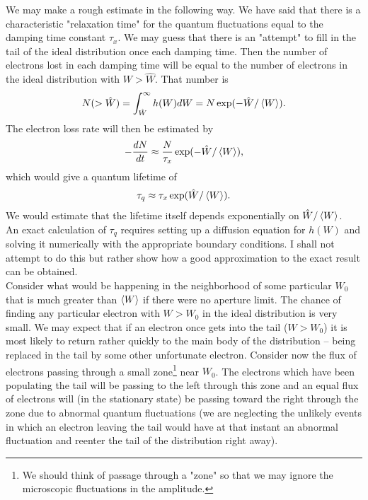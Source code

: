 We may make a rough estimate in the following way. We have said that there is a characteristic
 "relaxation time" for the quantum fluctuations equal to the damping time constant $\tau_x$. We may guess that there is an "attempt" to fill in the tail of the ideal distribution once each damping time. Then the number of electrons lost in each damping time will be equal to the number of electrons in the ideal distribution with $W > \hat{W}$. That number is
\begin{align}
	N(>\hat{W}) = \int_{\hat{W}}^\infty h(W) dW = N \exp(-\hat{W}/\left< W \right>).
\end{align}
The electron loss rate will then be estimated by
\begin{align}
	- \dfrac{dN}{dt} \approx \dfrac{N}{\tau_x} \exp(-\hat{W}/\left< W \right>),
\end{align}
which would give a quantum lifetime of
\begin{align}\label{eq:5.123}
	\tau_q \approx \tau_x \exp(\hat{W}/\left< W \right>).
\end{align}
We would estimate that the lifetime itself depends exponentially on $\hat{W}/\left< W \right>$.\\
An exact calculation of $\tau_q$ requires setting up a diffusion equation for $h(W)$ and solving it numerically with the appropriate boundary conditions. I shall not attempt to do this but rather show how a good approximation to the exact result can be obtained.\\
Consider what would be happening in the neighborhood of some particular $W_0$ that is much greater than $\left< W \right>$ if there were no aperture limit. The chance of finding any particular
 electron with $W > W_0$ in the ideal distribution is very small. We may expect that if an electron once gets into the tail ($W > W_0$) it is most likely to return rather quickly to the main body of the distribution -- being replaced in the tail by some other unfortunate electron. Consider now the flux of electrons passing through a small zone\footnote{We should think of passage through a "zone" so that we may ignore the microscopic fluctuations in the amplitude.} near $W_0$. The electrons which have been populating the tail will be passing to the left through this zone and an equal flux of electrons will (in the stationary state) be passing toward the right through the zone due to abnormal quantum fluctuations (we are neglecting the unlikely events in which an electron leaving the tail would have at that instant an abnormal fluctuation and reenter the tail of the distribution right away).\\
